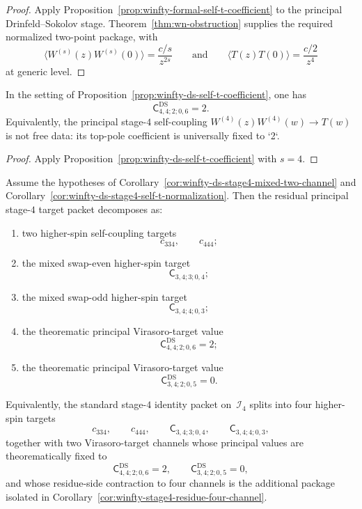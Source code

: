 \begin{proof}
Apply Proposition~\ref{prop:winfty-formal-self-t-coefficient} to the
principal Drinfeld--Sokolov stage.  Theorem~\ref{thm:wn-obstruction}
supplies the required normalized two-point package, with
\[
\langle W^{(s)}(z)W^{(s)}(0)\rangle=\frac{c/s}{z^{2s}}
\qquad\text{and}\qquad
\langle T(z)T(0)\rangle=\frac{c/2}{z^4}
\]
at generic level.
\end{proof}

\begin{corollary}
\label{cor:winfty-ds-stage4-self-t-normalization}
In the setting of Proposition~\ref{prop:winfty-ds-self-t-coefficient},
one has
\[
\mathsf{C}^{\mathrm{DS}}_{4,4;2;0,6}=2.
\]
Equivalently, the principal stage-$4$ self-coupling
$W^{(4)}(z)W^{(4)}(w)\to T(w)$ is not free data: its top-pole
coefficient is universally fixed to `2`.
\end{corollary}

\begin{proof}
Apply Proposition~\ref{prop:winfty-ds-self-t-coefficient} with $s=4$.
\end{proof}

\begin{corollary}
\label{cor:winfty-ds-stage4-five-plus-zero}
Assume the hypotheses of
Corollary~\ref{cor:winfty-ds-stage4-mixed-two-channel} and
Corollary~\ref{cor:winfty-ds-stage4-self-t-normalization}.  Then the
residual principal stage-$4$ target packet decomposes as:
\begin{enumerate}[label=\textup{(\roman*)}]
\item two higher-spin self-coupling targets
  \[
  c_{334},\qquad c_{444};
  \]
\item the mixed swap-even higher-spin target
  \[
  \mathsf{C}_{3,4;3;0,4};
  \]
\item the mixed swap-odd higher-spin target
  \[
  \mathsf{C}_{3,4;4;0,3};
  \]
\item the theorematic principal Virasoro-target value
  \[
  \mathsf{C}^{\mathrm{DS}}_{4,4;2;0,6}=2;
  \]
\item the theorematic principal Virasoro-target value
  \[
  \mathsf{C}^{\mathrm{DS}}_{3,4;2;0,5}=0.
  \]
\end{enumerate}
Equivalently, the standard stage-$4$ identity packet on~$\mathcal{I}_4$
splits into four higher-spin targets
\[
c_{334},\qquad c_{444},\qquad
\mathsf{C}_{3,4;3;0,4},\qquad \mathsf{C}_{3,4;4;0,3},
\]
together with two Virasoro-target channels whose principal values are
theorematically fixed to
\[
\mathsf{C}^{\mathrm{DS}}_{4,4;2;0,6}=2,
\qquad
\mathsf{C}^{\mathrm{DS}}_{3,4;2;0,5}=0,
\]
and whose residue-side contraction to four channels is the additional
package isolated in
Corollary~\ref{cor:winfty-stage4-residue-four-channel}.
\end{corollary}


